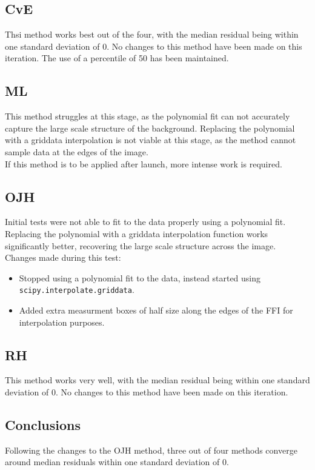\documentclass[10pt, a4paper]{article}
\begin{document}
\subsection{CvE}
Thsi method works best out of the four, with the median residual being within one standard deviation of 0. No changes to this method have been made on this iteration. The use of a percentile of 50 has been maintained.

\subsection{ML}
This method struggles at this stage, as the polynomial fit can not accurately capture the large scale structure of the background. Replacing the polynomial with a griddata interpolation is not viable at this stage, as the method cannot sample data at the edges of the image. \\

If this method is to be applied after launch, more intense work is required.

\subsection{OJH}
Initial tests were not able to fit to the data properly using a polynomial fit. Replacing the polynomial with a griddata interpolation function works significantly better, recovering the large scale structure across the image.\\

Changes made during this test:
\begin{itemize}
\item Stopped using a polynomial fit to the data, instead started using \texttt{scipy.interpolate.griddata}.
\item Added extra measurment boxes of half size along the edges of the FFI for interpolation purposes.
\end{itemize}

\subsection{RH}
This method works very well, with the median residual being within one standard deviation of 0. No changes to this method have been made on this iteration.

\subsection{Conclusions}
Following the changes to the OJH method, three out of four methods converge around median residuals within one standard deviation of 0. 
\end{document}
